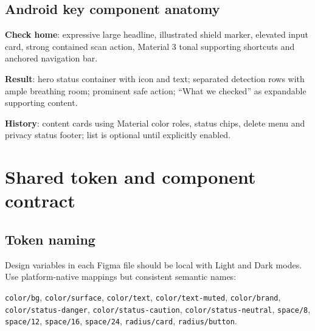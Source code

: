 \documentclass[10pt,a4paper]{article}
\begin{document}
\subsection{Android key component anatomy}
\begin{featurebox}
\textbf{Check home}: expressive large headline, illustrated shield marker, elevated input card, strong contained scan action, Material 3 tonal supporting shortcuts and anchored navigation bar.\par
\textbf{Result}: hero status container with icon and text; separated detection rows with ample breathing room; prominent safe action; ``What we checked'' as expandable supporting content.\par
\textbf{History}: content cards using Material color roles, status chips, delete menu and privacy status footer; list is optional until explicitly enabled.
\end{featurebox}

\section{Shared token and component contract}
\subsection{Token naming}
Design variables in each Figma file should be local with Light and Dark modes. Use platform-native mappings but consistent semantic names:\par
\texttt{color/bg}, \texttt{color/surface}, \texttt{color/text}, \texttt{color/text-muted}, \texttt{color/brand}, \texttt{color/status-danger}, \texttt{color/status-caution}, \texttt{color/status-neutral}, \texttt{space/8}, \texttt{space/12}, \texttt{space/16}, \texttt{space/24}, \texttt{radius/card}, \texttt{radius/button}.
\end{document}
